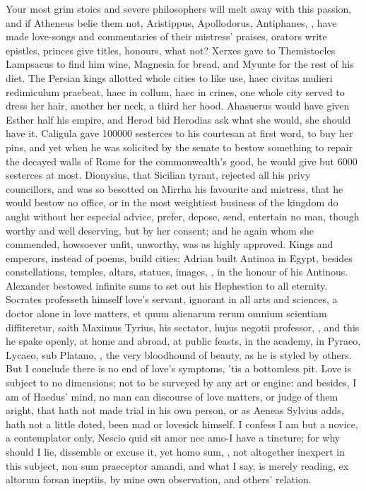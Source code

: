 Your most grim stoics and severe philosophers will melt away with this
passion, and if Atheneus belie them not, Aristippus, Apollodorus,
Antiphanes, \etc{}, have made love-songs and commentaries of their
mistress' praises, orators write epistles, princes give titles,
honours, what not? Xerxes gave to Themistocles Lampsacus to find
him wine, Magnesia for bread, and Myunte for the rest of his diet. The
Persian kings allotted whole cities to like use, haec civitas
mulieri redimiculum praebeat, haec in collum, haec in crines, one whole
city served to dress her hair, another her neck, a third her hood.
Ahasuerus would have given Esther half his empire, and
Herod bid Herodias ask what she would, she should have it.
Caligula gave 100\thinspace{}000 sesterces to his courtesan at first word, to buy
her pins, and yet when he was solicited by the senate to bestow
something to repair the decayed walls of Rome for the commonwealth's
good, he would give but 6000 sesterces at most. Dionysius, that
Sicilian tyrant, rejected all his privy councillors, and was so
besotted on Mirrha his favourite and mistress, that he would bestow no
office, or in the most weightiest business of the kingdom do aught
without her especial advice, prefer, depose, send, entertain no man,
though worthy and well deserving, but by her consent; and he again whom
she commended, howsoever unfit, unworthy, was as highly approved. Kings
and emperors, instead of poems, build cities; Adrian built Antinoa in
Egypt, besides constellations, temples, altars, statues, images, \etc{},
in the honour of his Antinous. Alexander bestowed infinite sums to set
out his Hephestion to all eternity. Socrates professeth himself
love's servant, ignorant in all arts and sciences, a doctor alone in
love matters, et quum alienarum rerum omnium scientiam diffiteretur,
saith Maximus Tyrius, his sectator, hujus negotii professor, \etc{},
and this he spake openly, at home and abroad, at public feasts, in the
academy, in Pyraeo, Lycaeo, sub Platano, \etc{}, the very bloodhound of
beauty, as he is styled by others. But I conclude there is no end of
love's symptoms, 'tis a bottomless pit. Love is subject to no
dimensions; not to be surveyed by any art or engine: and besides, I am
of Haedus' mind, no man can discourse of love matters, or judge
of them aright, that hath not made trial in his own person, or as
Aeneas Sylvius adds, hath not a little doted, been mad or
lovesick himself. I confess I am but a novice, a contemplator only,
Nescio quid sit amor nec amo-I have a tincture; for why should I
lie, dissemble or excuse it, yet homo sum, \etc{}, not altogether inexpert
in this subject, non sum praeceptor amandi, and what I say, is merely
reading, ex altorum forsan ineptiis, by mine own observation, and
others' relation.


